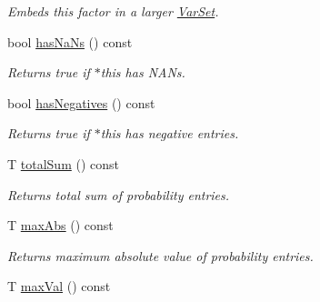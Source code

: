 \begin{CompactItemize}
\begin{CompactList}\small\item\em Embeds this factor in a larger \hyperlink{classdai_1_1VarSet}{VarSet}. \item\end{CompactList}\item 
\hypertarget{classdai_1_1TFactor_dafb816c6d9f93ceea858709391841d2}{
bool \hyperlink{classdai_1_1TFactor_dafb816c6d9f93ceea858709391841d2}{hasNaNs} () const }
\label{classdai_1_1TFactor_dafb816c6d9f93ceea858709391841d2}

\begin{CompactList}\small\item\em Returns true if $\ast$this has NANs. \item\end{CompactList}\item 
\hypertarget{classdai_1_1TFactor_7353d87f8a1d4c6c24b9cc5de7b18219}{
bool \hyperlink{classdai_1_1TFactor_7353d87f8a1d4c6c24b9cc5de7b18219}{hasNegatives} () const }
\label{classdai_1_1TFactor_7353d87f8a1d4c6c24b9cc5de7b18219}

\begin{CompactList}\small\item\em Returns true if $\ast$this has negative entries. \item\end{CompactList}\item 
\hypertarget{classdai_1_1TFactor_aff9f62e6ef5792a459946cd81bd35af}{
T \hyperlink{classdai_1_1TFactor_aff9f62e6ef5792a459946cd81bd35af}{totalSum} () const }
\label{classdai_1_1TFactor_aff9f62e6ef5792a459946cd81bd35af}

\begin{CompactList}\small\item\em Returns total sum of probability entries. \item\end{CompactList}\item 
\hypertarget{classdai_1_1TFactor_8e67b044dfaebf20c77031a2378e65f5}{
T \hyperlink{classdai_1_1TFactor_8e67b044dfaebf20c77031a2378e65f5}{maxAbs} () const }
\label{classdai_1_1TFactor_8e67b044dfaebf20c77031a2378e65f5}

\begin{CompactList}\small\item\em Returns maximum absolute value of probability entries. \item\end{CompactList}\item 
\hypertarget{classdai_1_1TFactor_160c82f59a3202180025853a9e5caaa5}{
T \hyperlink{classdai_1_1TFactor_160c82f59a3202180025853a9e5caaa5}{maxVal} () const }
\label{classdai_1_1TFactor_160c82f59a3202180025853a9e5caaa5}


\end{CompactItemize}

